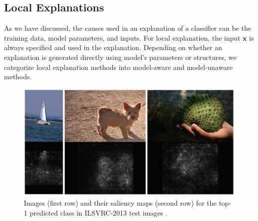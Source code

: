









\subsection{Local Explanations}

As we have discussed, the causes used in an explanation of a classifier can be the training data, model parameters, and inputs. For local explanation, the input $\mathbf{x}$ is always specified and used in the explanation. Depending on whether an explanation is generated directly using model's parameters or structures, we categorize local explanation methods into model-aware and model-unaware methods.

\begin{figure}[tb]
  \centering
  \includegraphics[width=1.0\textwidth]{figure/saliency-map}
  \caption{Images (first row) and their saliency maps (second row) for the top-1 predicted class in ILSVRC-2013 test images \cite{simonyan14saliency}.}
  \label{fig:saliency-map}
\end{figure}

